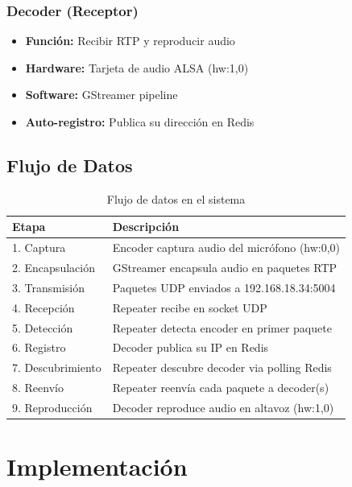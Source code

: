 \documentclass[12pt,a4paper]{article}
\begin{document}
\subsubsection{Decoder (Receptor)}

\begin{itemize}
    \item \textbf{Función:} Recibir RTP y reproducir audio
    \item \textbf{Hardware:} Tarjeta de audio ALSA (hw:1,0)
    \item \textbf{Software:} GStreamer pipeline
    \item \textbf{Auto-registro:} Publica su dirección en Redis
\end{itemize}

\subsection{Flujo de Datos}

\begin{table}[H]
\centering
\caption{Flujo de datos en el sistema}
\label{tab:dataflow}
\begin{tabular}{@{}lp{10cm}@{}}
\toprule
\textbf{Etapa} & \textbf{Descripción} \\ \midrule
1. Captura & Encoder captura audio del micrófono (hw:0,0) \\
2. Encapsulación & GStreamer encapsula audio en paquetes RTP \\
3. Transmisión & Paquetes UDP enviados a 192.168.18.34:5004 \\
4. Recepción & Repeater recibe en socket UDP \\
5. Detección & Repeater detecta encoder en primer paquete \\
6. Registro & Decoder publica su IP en Redis \\
7. Descubrimiento & Repeater descubre decoder via polling Redis \\
8. Reenvío & Repeater reenvía cada paquete a decoder(s) \\
9. Reproducción & Decoder reproduce audio en altavoz (hw:1,0) \\
\bottomrule
\end{tabular}
\end{table}

\newpage

\section{Implementación}
\end{document}
